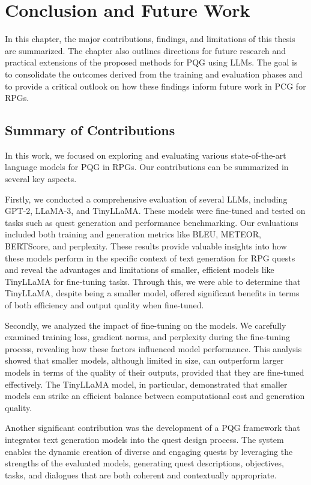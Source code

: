 \clearpage

\chapter{Conclusion and Future Work}

In this chapter, the major contributions, findings, and limitations of this thesis are summarized.
The chapter also outlines directions for future research and practical extensions
of the proposed methods for PQG using LLMs. The goal is to consolidate the outcomes
derived from the training and evaluation phases and to provide a critical outlook on how
these findings inform future work in PCG for RPGs.

\section{Summary of Contributions}

In this work, we focused on exploring and evaluating various state-of-the-art language
models for PQG in RPGs. Our contributions can be summarized in several key aspects.

Firstly, we conducted a comprehensive evaluation of several LLMs, including GPT-2,
LLaMA-3, and TinyLLaMA. These models were fine-tuned and tested on tasks such as
quest generation and performance benchmarking. Our evaluations included both training
and generation metrics like BLEU, METEOR, BERTScore, and perplexity. These results
provide valuable insights into how these models perform in the specific context of text
generation for RPG quests and reveal the advantages and limitations of smaller, efficient
models like TinyLLaMA for fine-tuning tasks. Through this, we were able to determine
that TinyLLaMA, despite being a smaller model, offered significant benefits in terms of
both efficiency and output quality when fine-tuned.

Secondly, we analyzed the impact of fine-tuning on the models. We carefully examined
training loss, gradient norms, and perplexity during the fine-tuning process, revealing how
these factors influenced model performance. This analysis showed that smaller models,
although limited in size, can outperform larger models in terms of the quality of their outputs,
provided that they are fine-tuned effectively. The TinyLLaMA model, in particular,
demonstrated that smaller models can strike an efficient balance between computational
cost and generation quality.

Another significant contribution was the development of a PQG framework that integrates
text generation models into the quest design process. The system enables the
dynamic creation of diverse and engaging quests by leveraging the strengths of the evaluated
models, generating quest descriptions, objectives, tasks, and dialogues that are both
coherent and contextually appropriate.

